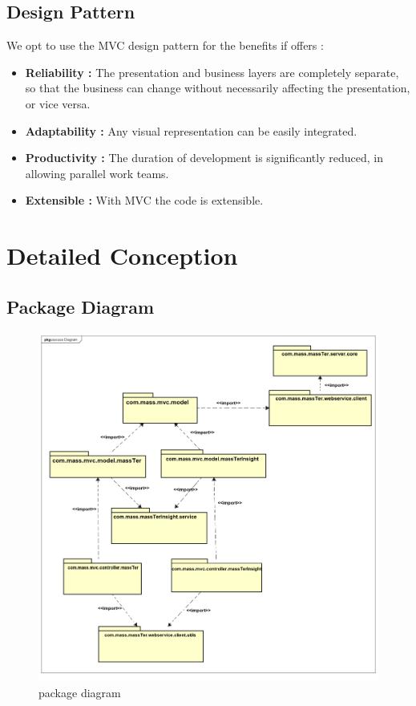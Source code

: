 	\subsection{Design Pattern}
		We opt to use the MVC design pattern for the benefits if offers :
	\begin{itemize}
		\item \textbf{Reliability : }The presentation and business layers are completely separate, so that the business can change without necessarily affecting the presentation, or vice versa.
		\item \textbf{Adaptability : }Any visual representation can be easily integrated.
		\item \textbf{Productivity : }The duration of development is significantly reduced, in allowing parallel work teams.
		\item \textbf{Extensible : } With MVC the code is extensible.
	\end{itemize}

	\clearpage
    \newpage

	\section{Detailed Conception}
    \clearpage
	\newpage
	\subsection{Package Diagram}
		\begin{figure}[h]
		\centering
		\includegraphics[width=1\textwidth]{packageDiagram.png}
		\caption{package diagram}
	\end{figure}
  
